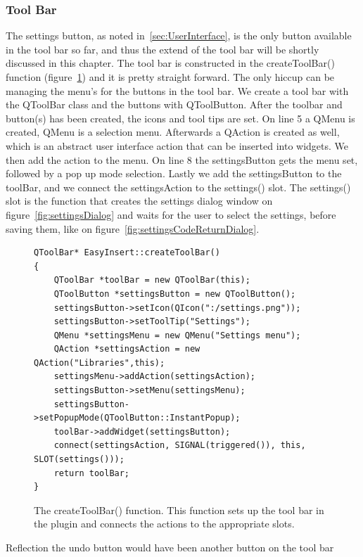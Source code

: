\subsubsection{Tool Bar}
\label{sec:ToolBar}
The settings button, as noted in~\ref{sec:UserInterface}, is the only button available in the tool bar so far, and thus the extend of the tool bar will be shortly discussed in this chapter.
The tool bar is constructed in the createToolBar() function (figure~\ref{fig:settingsToolBarCode}) and it is pretty straight forward. The only hiccup can be managing the menu's for the buttons in the tool bar. We create a tool bar with the QToolBar class and the buttons with QToolButton. After the toolbar and button(s) has been created, the icons and tool tips are set. On line 5 a QMenu is created, QMenu is a selection menu. Afterwards a QAction is created as well, which is an abstract user interface action that can be inserted into widgets. We then add the action to the menu. On line 8 the settingsButton gets the menu set, followed by a pop up mode selection. Lastly we add the settingsButton to the toolBar, and we connect the settingsAction to the settings() slot. The settings() slot is the function that creates the settings dialog window on figure~\ref{fig:settingsDialog} and waits for the user to select the settings, before saving them, like on figure~\ref{fig:settingsCodeReturnDialog}.

\begin{figure}[h] %
\centering
\lstset{language=C++} 
\begin{lstlisting}[frame=single] 
QToolBar* EasyInsert::createToolBar()
{ 
	QToolBar *toolBar = new QToolBar(this);
	QToolButton *settingsButton = new QToolButton();
	settingsButton->setIcon(QIcon(":/settings.png"));
	settingsButton->setToolTip("Settings");
	QMenu *settingsMenu = new QMenu("Settings menu");
	QAction *settingsAction = new QAction("Libraries",this);
	settingsMenu->addAction(settingsAction);
	settingsButton->setMenu(settingsMenu);
	settingsButton->setPopupMode(QToolButton::InstantPopup);
	toolBar->addWidget(settingsButton);
	connect(settingsAction, SIGNAL(triggered()), this, SLOT(settings()));
	return toolBar;
}
\end{lstlisting}
\caption{The createToolBar() function. This function sets up the tool bar in the plugin and connects the actions to the appropriate slots.}
\label{fig:settingsToolBarCode} 	
\end{figure}

Reflection
the undo button would have been another button on the tool bar

